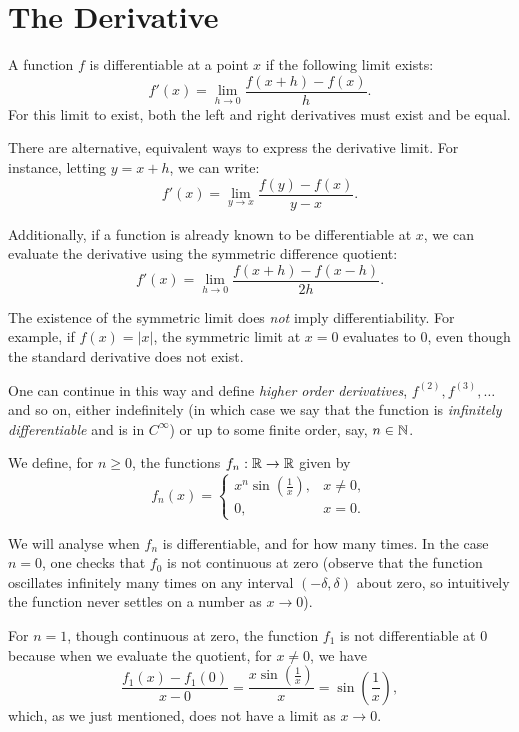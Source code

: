 \documentclass[../calculus.tex]{subfiles}
\begin{document}
\chapter{The Derivative}

\begin{definition}[Differentiability]
    \begin{shaded*}
        A function $f$ is differentiable at a point $x$ if the following limit exists:
        \[f'(x) = \lim_{h\to 0} \frac{f(x+h)-f(x)}{h}.\]
        For this limit to exist, both the left and right derivatives must exist and be equal.
    \end{shaded*}
\end{definition}

There are alternative, equivalent ways to express the derivative limit. For instance, letting $y = x+h$, we can write:
\[f'(x) = \lim_{y\to x} \frac{f(y)-f(x)}{y-x}.\]

Additionally, if a function is already known to be differentiable at $x$, we can evaluate the derivative using the symmetric difference quotient:
\[f'(x) = \lim_{h\to 0} \frac{f(x+h)-f(x-h)}{2h}.\]
\begin{remark}
    The existence of the symmetric limit does \textit{not} imply differentiability. For example, if $f(x) = |x|$, the symmetric limit at $x=0$ evaluates to $0$, even though the standard derivative does not exist.
\end{remark}

One can continue in this way and define \textit{higher order derivatives}, $f^{(2)},f^{(3)},\dots$ and so on, either indefinitely (in which case we say that the function is \textit{infinitely differentiable} and is in $C^\infty$) or up to some finite order, say, $n\in\mathbb{N}$.

\begin{example}
  We define, for $n\ge 0$, the functions $f_n:\mathbb{R}\to\mathbb{R}$ given by \[f_n(x)=\begin{cases}
    x^n\sin\left(\frac{1}{x}\right), & x\ne 0,\\
    0, & x = 0.
  \end{cases}\]
\end{example}
We will analyse when $f_n$ is differentiable, and for how many times. In the case $n=0$, one checks that $f_0$ is not continuous at zero (observe that the function oscillates infinitely many times on any interval $(-\delta,\delta)$ about zero, so intuitively the function never settles on a number as $x\to 0$).

For $n=1$, though continuous at zero, the function $f_1$ is not differentiable at 0 because when we evaluate the quotient, for $x\ne 0$, we have
\[\frac{f_1(x)-f_1(0)}{x-0}=\frac{x\sin\left(\frac{1}{x}\right)}{x}=\sin\left(\frac{1}{x}\right),\]
which, as we just mentioned, does not have a limit as $x\to 0$.
\end{document}
